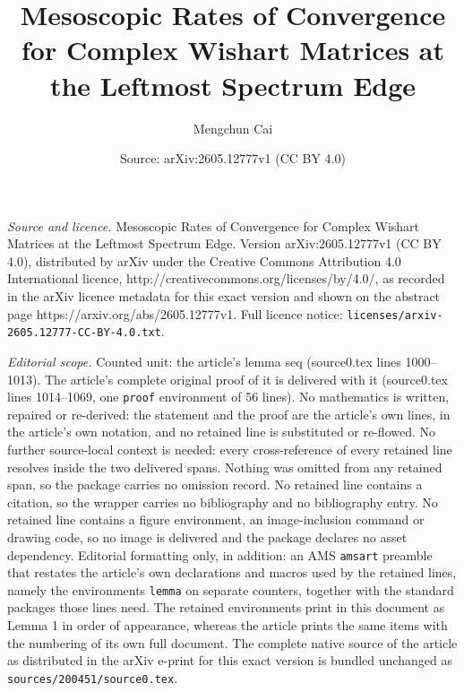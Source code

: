 \documentclass[10pt,a4paper]{amsart}
\title{Mesoscopic Rates of Convergence for Complex Wishart Matrices at the Leftmost Spectrum Edge}
\author{Mengchun Cai}
\date{Source: arXiv:2605.12777v1 (CC BY 4.0)}
\begin{document}
\maketitle

\noindent\emph{Source and licence.} Mesoscopic Rates of Convergence for Complex Wishart Matrices at the Leftmost Spectrum Edge. Version arXiv:2605.12777v1 (CC BY 4.0), distributed by arXiv under the Creative Commons Attribution 4.0 International licence, http://creativecommons.org/licenses/by/4.0/, as recorded in the arXiv licence metadata for this exact version and shown on the abstract page https://arxiv.org/abs/2605.12777v1. Full licence notice: \texttt{licenses/arxiv-2605.12777-CC-BY-4.0.txt}.\par\smallskip

\noindent\textit{Editorial scope.} Counted unit: the article's lemma seq (source0.tex lines 1000--1013). The article's complete original proof of it is delivered with it (source0.tex lines 1014--1069, one \texttt{proof} environment of 56 lines). No mathematics is written, repaired or re-derived: the statement and the proof are the article's own lines, in the article's own notation, and no retained line is substituted or re-flowed.  No further source-local context is needed: every cross-reference of every retained line resolves inside the two delivered spans.  Nothing was omitted from any retained span, so the package carries no omission record.  No retained line contains a citation, so the wrapper carries no bibliography and no bibliography entry.  No retained line contains a figure environment, an image-inclusion command or drawing code, so no image is delivered and the package declares no asset dependency.  Editorial formatting only, in addition: an AMS \texttt{amsart} preamble that restates the article's own declarations and macros used by the retained lines, namely the environments \texttt{lemma} on separate counters, together with the standard packages those lines need.  The retained environments print in this document as Lemma 1 in order of appearance, whereas the article prints the same items with the numbering of its own full document.  The complete native source of the article as distributed in the arXiv e-print for this exact version is bundled unchanged as \texttt{sources/200451/source0.tex}.
\end{document}
